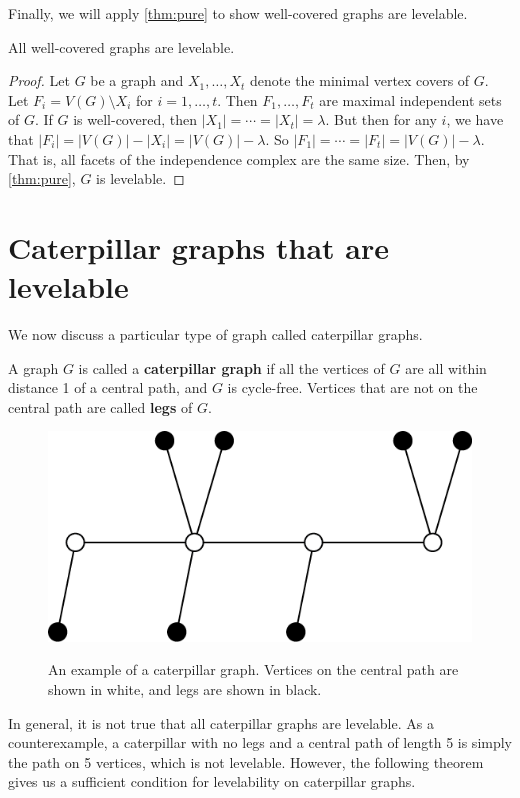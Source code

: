 Finally, we will apply \autoref{thm:pure} to show well-covered graphs are levelable.

\begin{theorem}
All well-covered graphs are levelable.
\end{theorem}
\begin{proof}
Let $G$ be a graph and $X_1, \dots, X_t$ denote the minimal vertex covers of $G$. Let  $F_i = V(G) \setminus X_i$ for $i = 1, \dots, t$. Then $F_1, \dots, F_t$ are maximal independent sets of $G$. If $G$ is well-covered, then $|X_1| =  \cdots = |X_t| = \lambda$. But then for any $i$, we have that $|F_i| = |V(G)| - |X_i| = |V(G)| - \lambda$. So $|F_1| = \cdots = |F_t| = |V(G)| - \lambda$. That is, all facets of the independence complex are the same size. Then, by \autoref{thm:pure}, $G$ is levelable.
\end{proof}

\section{Caterpillar graphs that are levelable} \label{sec:caterpillar}

We now discuss a particular type of graph called caterpillar graphs.

\begin{definition}
A graph $G$ is called a \textbf{caterpillar graph} if all the vertices of $G$ are all within distance 1 of a central path, and $G$ is cycle-free. Vertices that are not on the central path are called \textbf{legs} of $G$.
\end{definition}
\begin{figure}[bth]
    \myfloatalign
    {\includegraphics[width=.42\linewidth]{figures/caterpillar.png}} 
    \caption{An example of a caterpillar graph. Vertices on the central path are shown in white, and legs are shown in black.}
\end{figure}

In general, it is not true that all caterpillar graphs are levelable. As a counterexample, a caterpillar with no legs and a central path of length 5 is simply the path on 5 vertices, which is not levelable. However, the following theorem gives us a sufficient condition for levelability on caterpillar graphs.

